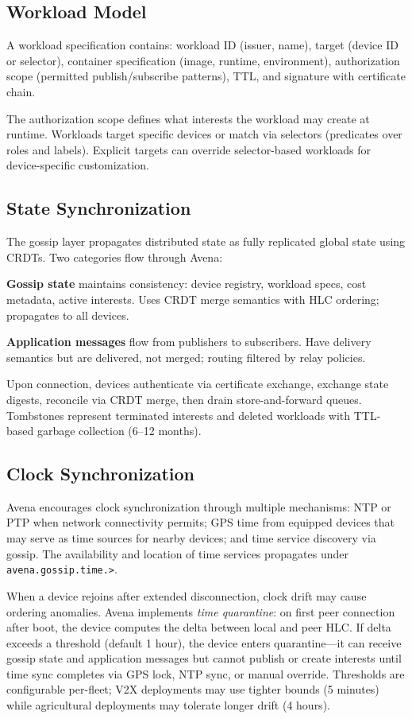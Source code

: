 \documentclass[journal]{IEEEtran}
\begin{document}
\subsection{Workload Model}

A workload specification contains: workload ID (issuer, name), target (device ID or selector), container specification (image, runtime, environment), authorization scope (permitted publish/subscribe patterns), TTL, and signature with certificate chain.

The authorization scope defines what interests the workload may create at runtime. Workloads target specific devices or match via selectors (predicates over roles and labels). Explicit targets can override selector-based workloads for device-specific customization.

\subsection{State Synchronization}

The gossip layer propagates distributed state as fully replicated global state using CRDTs. Two categories flow through Avena:

\textbf{Gossip state} maintains consistency: device registry, workload specs, cost metadata, active interests. Uses CRDT merge semantics with HLC ordering; propagates to all devices.

\textbf{Application messages} flow from publishers to subscribers. Have delivery semantics but are delivered, not merged; routing filtered by relay policies.

Upon connection, devices authenticate via certificate exchange, exchange state digests, reconcile via CRDT merge, then drain store-and-forward queues. Tombstones represent terminated interests and deleted workloads with TTL-based garbage collection (6--12 months).

\subsection{Clock Synchronization}

Avena encourages clock synchronization through multiple mechanisms: NTP or PTP when network connectivity permits; GPS time from equipped devices that may serve as time sources for nearby devices; and time service discovery via gossip. The availability and location of time services propagates under \texttt{avena.gossip.time.>}.

When a device rejoins after extended disconnection, clock drift may cause ordering anomalies. Avena implements \emph{time quarantine}: on first peer connection after boot, the device computes the delta between local and peer HLC. If delta exceeds a threshold (default 1 hour), the device enters quarantine---it can receive gossip state and application messages but cannot publish or create interests until time sync completes via GPS lock, NTP sync, or manual override. Thresholds are configurable per-fleet; V2X deployments may use tighter bounds (5 minutes) while agricultural deployments may tolerate longer drift (4 hours).
\end{document}
